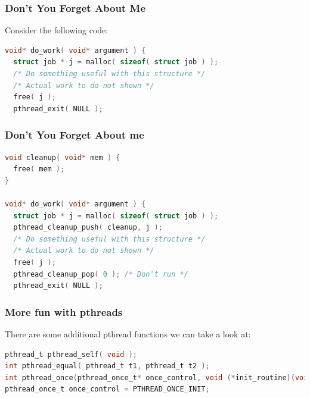\begin{frame}[fragile]
\frametitle{Don't You Forget About Me}

Consider the following code: 
\begin{lstlisting}[language=C]
void* do_work( void* argument ) {
  struct job * j = malloc( sizeof( struct job ) );
  /* Do something useful with this structure */
  /* Actual work to do not shown */
  free( j );
  pthread_exit( NULL );
\end{lstlisting}


\end{frame}



\begin{frame}[fragile]
\frametitle{Don't You Forget About me}

\begin{lstlisting}[language=C]
void cleanup( void* mem ) {
  free( mem );
}

void* do_work( void* argument ) {
  struct job * j = malloc( sizeof( struct job ) );
  pthread_cleanup_push( cleanup, j );
  /* Do something useful with this structure */
  /* Actual work to do not shown */
  free( j );
  pthread_cleanup_pop( 0 ); /* Don't run */
  pthread_exit( NULL );
\end{lstlisting}



\end{frame}


\begin{frame}[fragile]
\frametitle{More fun with pthreads}

There are some additional pthread functions we can take a look at:

\begin{lstlisting}[language=C]
pthread_t pthread_self( void );
int pthread_equal( pthread_t t1, pthread_t t2 );
int pthread_once(pthread_once_t* once_control, void (*init_routine)(void));
pthread_once_t once_control = PTHREAD_ONCE_INIT;
\end{lstlisting}



\end{frame}






